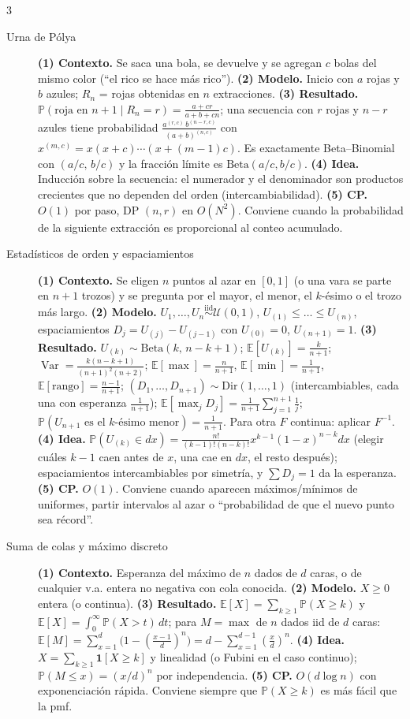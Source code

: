 \documentclass[8pt, spanish, mexico, letterpaper]{extarticle}
\newcommand{\E}{\mathbb{E}}
\newcommand{\Var}{\operatorname{Var}}
\newcommand{\Prob}{\mathbb{P}}
\newcommand{\<}{<}
\begin{document}
\begin{multicols*}{3}
\begin{description}
\item[Urna de P\'olya] \textbf{(1) Contexto.} Se saca una bola, se devuelve y se agregan $c$ bolas del mismo color (``el rico se hace m\'as rico''). \textbf{(2) Modelo.} Inicio con $a$ rojas y $b$ azules; $R_n$ = rojas obtenidas en $n$ extracciones. \textbf{(3) Resultado.} $\Prob(\text{roja en }n + 1\mid R_n{=}r)=\frac{a+cr}{a+b+cn}$; una secuencia con $r$ rojas y $n - r$ azules tiene probabilidad $\frac{a^{(r,c)}\,b^{(n-r,c)}}{(a+b)^{(n,c)}}$ con $x^{(m,c)}=x(x + c)\cdots(x + (m - 1)c)$. Es exactamente Beta--Binomial con $(a/c,\,b/c)$ y la fracción límite es $\mathrm{Beta}(a/c,b/c)$. \textbf{(4) Idea.} Inducción sobre la secuencia: el numerador y el denominador son productos crecientes que no dependen del orden (intercambiabilidad). \textbf{(5) CP.} $O(1)$ por paso, DP $(n,r)$ en $O(N^2)$. Conviene cuando la probabilidad de la siguiente extracci\'on es proporcional al conteo acumulado.

\item[Estad\'isticos de orden y espaciamientos] \textbf{(1) Contexto.} Se eligen $n$ puntos al azar en $[0,1]$ (o una vara se parte en $n + 1$ trozos) y se pregunta por el mayor, el menor, el $k$-\'esimo o el trozo m\'as largo. \textbf{(2) Modelo.} $U_1,\dots,U_n\overset{\mathrm{iid}}{\sim}\mathcal U(0,1)$, $U_{(1)}\le\dots\le U_{(n)}$, espaciamientos $D_j=U_{(j)}-U_{(j-1)}$ con $U_{(0)}{=}0$, $U_{(n+1)}{=}1$. \textbf{(3) Resultado.} $U_{(k)}\sim\mathrm{Beta}(k,\,n - k + 1)$; $\E[U_{(k)}]=\frac k{n+1}$; $\Var=\frac{k(n-k+1)}{(n+1)^2(n+2)}$; $\E[\max]=\frac n{n+1}$, $\E[\min]=\frac1{n+1}$, $\E[\text{rango}]=\frac{n-1}{n+1}$; $(D_1,\dots,D_{n+1})\sim\mathrm{Dir}(1,\dots,1)$ (intercambiables, cada una con esperanza $\frac1{n+1}$); $\E[\max_j D_j]=\frac1{n+1}\sum_{j=1}^{n+1}\frac1j$; $\Prob(U_{n+1}\text{ es el }k\text{-\'esimo menor})=\frac1{n+1}$. Para otra $F$ continua: aplicar $F^{-1}$. \textbf{(4) Idea.} $\Prob(U_{(k)}\in dx)=\frac{n!}{(k-1)!(n-k)!}x^{k-1}(1 - x)^{n-k}dx$ (elegir cu\'ales $k - 1$ caen antes de $x$, una cae en $dx$, el resto despu\'es); espaciamientos intercambiables por simetr\'ia, y $\sum D_j=1$ da la esperanza. \textbf{(5) CP.} $O(1)$. Conviene cuando aparecen m\'aximos/m\'inimos de uniformes, partir intervalos al azar o ``probabilidad de que el nuevo punto sea r\'ecord''.

\item[Suma de colas y m\'aximo discreto] \textbf{(1) Contexto.} Esperanza del m\'aximo de $n$ dados de $d$ caras, o de cualquier v.a. entera no negativa con cola conocida. \textbf{(2) Modelo.} $X\ge0$ entera (o continua). \textbf{(3) Resultado.} $\E[X]=\sum_{k\ge1}\Prob(X\ge k)$ y $\E[X]=\int_0^\infty\Prob(X>t)\,dt$; para $M=\max$ de $n$ dados iid de $d$ caras: $\E[M]=\sum_{x=1}^{d}\bigl(1-(\tfrac{x-1}d)^n\bigr)=d-\sum_{x=1}^{d-1}(\tfrac xd)^n$. \textbf{(4) Idea.} $X=\sum_{k\ge1}\mathbf 1[X\ge k]$ y linealidad (o Fubini en el caso continuo); $\Prob(M\le x)=(x/d)^n$ por independencia. \textbf{(5) CP.} $O(d\log n)$ con exponenciaci\'on r\'apida. Conviene siempre que $\Prob(X\ge k)$ es m\'as f\'acil que la pmf.


\end{description}
\end{multicols*}
\end{document}
